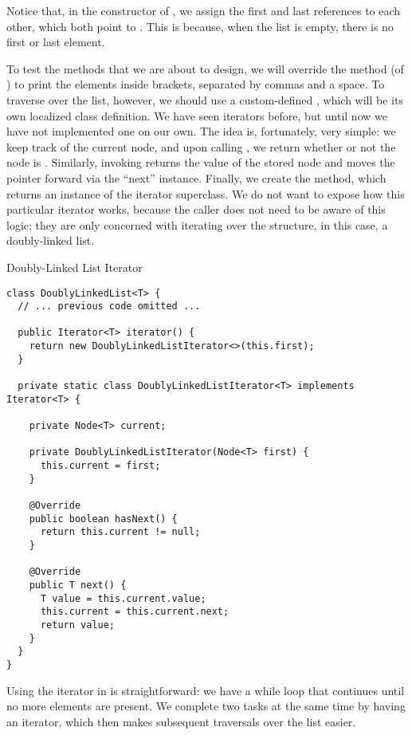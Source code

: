Notice that, in the constructor of , we assign the first and last references to each other, which both point to . This is because, when the list is empty, there is no first or last element.

To test the methods that we are about to design, we will override the  method (of ) to print the elements inside brackets, separated by commas and a space. To traverse over the list, however, we should use a custom-defined , which will be its own localized class definition. We have seen iterators before, but until now we have not implemented one on our own. The idea is, fortunately, very simple: we keep track of the current node, and upon calling , we return whether or not the node is . Similarly, invoking  returns the value of the stored node and moves the pointer forward via the ``next'' instance. Finally, we create the  method, which returns an instance of the iterator superclass. We do not want to expose how this particular iterator works, because the caller does not need to be aware of this logic; they are only concerned with iterating over the structure, in this case, a doubly-linked list.

\begin{cl}[]{Doubly-Linked List Iterator}
\begin{lstlisting}[language=MyJava]
class DoublyLinkedList<T> {
  // ... previous code omitted ...

  public Iterator<T> iterator() {
    return new DoublyLinkedListIterator<>(this.first);
  }

  private static class DoublyLinkedListIterator<T> implements Iterator<T> {
    
    private Node<T> current;

    private DoublyLinkedListIterator(Node<T> first) {
      this.current = first;
    }

    @Override
    public boolean hasNext() { 
      return this.current != null; 
    }

    @Override
    public T next() {
      T value = this.current.value;
      this.current = this.current.next;
      return value;
    }
  }
}
\end{lstlisting}
\end{cl}

Using the iterator in  is straightforward: we have a while loop that continues until no more elements are present. We complete two tasks at the same time by having an iterator, which then makes subsequent traversals over the list easier.

